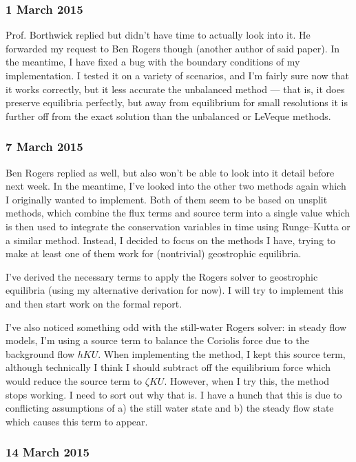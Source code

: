 \documentclass[a4paper,onecolumn,11pt]{report}
\begin{document}
\subsubsection*{1 March 2015}

Prof. Borthwick replied but didn't have time to actually look into it. He forwarded my request to Ben Rogers though (another author of said paper). In the meantime, I have fixed a bug with the boundary conditions of my implementation. I tested it on a variety of scenarios, and I'm fairly sure now that it works correctly, but it less accurate the unbalanced method --- that is, it does preserve equilibria perfectly, but away from equilibrium for small resolutions it is further off from the exact solution than the unbalanced or LeVeque methods.

\subsubsection*{7 March 2015}

Ben Rogers replied as well, but also won't be able to look into it detail before next week. In the meantime, I've looked into the other two methods again which I originally wanted to implement. Both of them seem to be based on unsplit methods, which combine the flux terms and source term into a single value which is then used to integrate the conservation variables in time using Runge--Kutta or a similar method. Instead, I decided to focus on the methods I have, trying to make at least one of them work for (nontrivial) geostrophic equilibria.

I've derived the necessary terms to apply the Rogers solver to geostrophic equilibria (using my alternative derivation for now). I will try to implement this and then start work on the formal report.

I've also noticed something odd with the still-water Rogers solver: in steady flow models, I'm using a source term to balance the Coriolis force due to the background flow $hKU$. When implementing the method, I kept this source term, although technically I think I should subtract off the equilibrium force which would reduce the source term to $\zeta KU$. However, when I try this, the method stops working. I need to sort out why that is. I have a hunch that this is due to conflicting assumptions of a) the still water state and b) the steady flow state which causes this term to appear.

\subsubsection*{14 March 2015}
\end{document}
